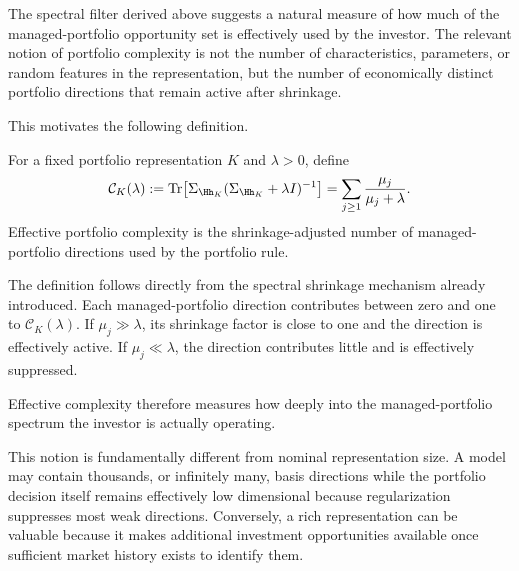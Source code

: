 The spectral filter derived above suggests a natural measure of how much of the
managed-portfolio opportunity set is effectively used by the investor. The
relevant notion of portfolio complexity is not the number of characteristics,
parameters, or random features in the representation, but the number of
economically distinct portfolio directions that remain active after shrinkage.

This motivates the following definition.

\begin{definition}
\label{def:effective_complexity}
For a fixed portfolio representation $K$ and $\lambda>0$, define
\begin{equation}
\mathcal C_K(\lambda)
:=
\operatorname{Tr}\!\left[
\Sigma_{\Hh_K}
(\Sigma_{\Hh_K}+\lambda I)^{-1}
\right]
=
\sum_{j\geq1}
\frac{\mu_j}{\mu_j+\lambda}.
\label{eq:effective_complexity}
\end{equation}
Effective portfolio complexity is the shrinkage-adjusted number of
managed-portfolio directions used by the portfolio rule.
\end{definition}

The definition follows directly from the spectral shrinkage mechanism already
introduced. Each managed-portfolio direction contributes between zero and one
to $\mathcal C_K(\lambda)$. If $\mu_j\gg\lambda$, its shrinkage factor is close
to one and the direction is effectively active. If $\mu_j\ll\lambda$, the
direction contributes little and is effectively suppressed.

Effective complexity therefore measures how deeply into the
managed-portfolio spectrum the investor is actually operating.

This notion is fundamentally different from nominal representation size. A
model may contain thousands, or infinitely many, basis directions while the
portfolio decision itself remains effectively low dimensional because
regularization suppresses most weak directions. Conversely, a rich
representation can be valuable because it makes additional investment
opportunities available once sufficient market history exists to identify them.

